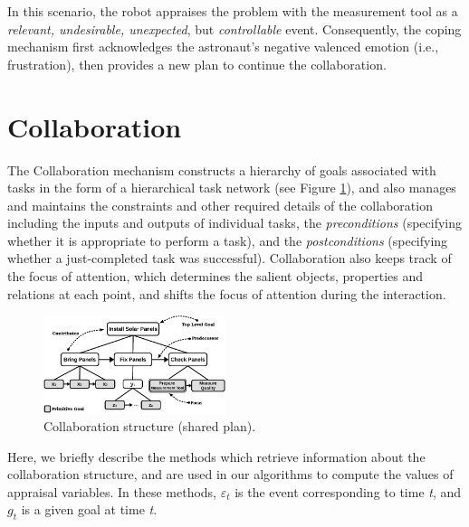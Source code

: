 \documentclass{article}
\begin{document}
\vspace*{-1mm}
In this scenario, the robot appraises the problem with the measurement tool as
a \textit{relevant, undesirable, unexpected}, but \textit{controllable} event.
Consequently, the coping mechanism first acknowledges the astronaut's negative
valenced emotion (i.e., frustration), then provides a new plan to continue the
collaboration.

\vspace*{-3mm}
\section{Collaboration}

The Collaboration mechanism constructs a hierarchy of goals associated with
tasks in the form of a hierarchical task network (see Figure \ref{fig:cs}), and
also manages and maintains the constraints and other required details of the
collaboration including the inputs and outputs of individual tasks, the
\textit{preconditions} (specifying whether it is appropriate to perform a task),
and the \textit{postconditions} (specifying whether a just-completed task was
successful). Collaboration also keeps track of the focus of attention, which
determines the salient objects, properties and relations at each point, and
shifts the focus of attention during the interaction.

\vspace*{-2mm}
\begin{figure}[tbh]
  \centering
  \includegraphics[width=0.474\textwidth]{figure/collaborationStructure-croped.pdf}
  \vspace*{-4mm}
  \caption{{\fontsize{9}{9}\selectfont Collaboration structure (shared plan).}}
  \label{fig:cs}
  \vspace*{-2mm}
\end{figure}

Here, we briefly describe the methods which retrieve information about the
collaboration structure, and are used in our algorithms to compute the values of
appraisal variables. In these methods, $\varepsilon_t$ is the event
corresponding to time \textit{t}, and $g_t$ is a given goal at time \textit{t}.
\end{document}
